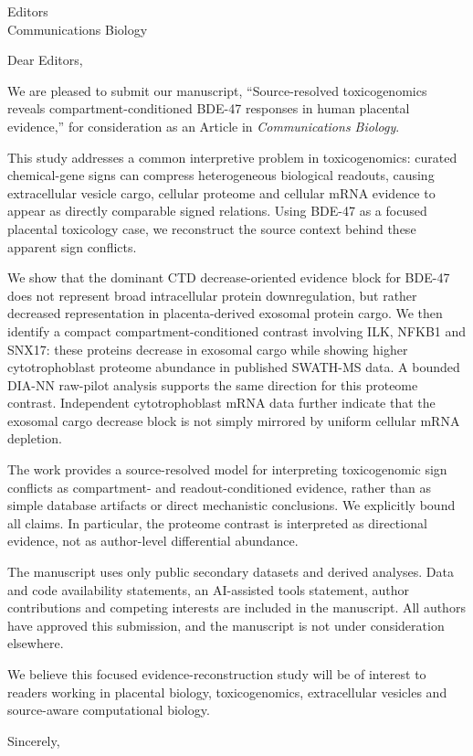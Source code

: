 \documentclass[11pt]{letter}
\date{2026-05-25}
\begin{document}
\begin{letter}{Editors\\Communications Biology}
\opening{Dear Editors,}

We are pleased to submit our manuscript, ``Source-resolved toxicogenomics reveals compartment-conditioned BDE-47 responses in human placental evidence,'' for consideration as an Article in \emph{Communications Biology}.

This study addresses a common interpretive problem in toxicogenomics: curated chemical-gene signs can compress heterogeneous biological readouts, causing extracellular vesicle cargo, cellular proteome and cellular mRNA evidence to appear as directly comparable signed relations. Using BDE-47 as a focused placental toxicology case, we reconstruct the source context behind these apparent sign conflicts.

We show that the dominant CTD decrease-oriented evidence block for BDE-47 does not represent broad intracellular protein downregulation, but rather decreased representation in placenta-derived exosomal protein cargo. We then identify a compact compartment-conditioned contrast involving ILK, NFKB1 and SNX17: these proteins decrease in exosomal cargo while showing higher cytotrophoblast proteome abundance in published SWATH-MS data. A bounded DIA-NN raw-pilot analysis supports the same direction for this proteome contrast. Independent cytotrophoblast mRNA data further indicate that the exosomal cargo decrease block is not simply mirrored by uniform cellular mRNA depletion.

The work provides a source-resolved model for interpreting toxicogenomic sign conflicts as compartment- and readout-conditioned evidence, rather than as simple database artifacts or direct mechanistic conclusions. We explicitly bound all claims. In particular, the proteome contrast is interpreted as directional evidence, not as author-level differential abundance.

The manuscript uses only public secondary datasets and derived analyses. Data and code availability statements, an AI-assisted tools statement, author contributions and competing interests are included in the manuscript. All authors have approved this submission, and the manuscript is not under consideration elsewhere.

We believe this focused evidence-reconstruction study will be of interest to readers working in placental biology, toxicogenomics, extracellular vesicles and source-aware computational biology.

\closing{Sincerely,}
\end{letter}
\end{document}
